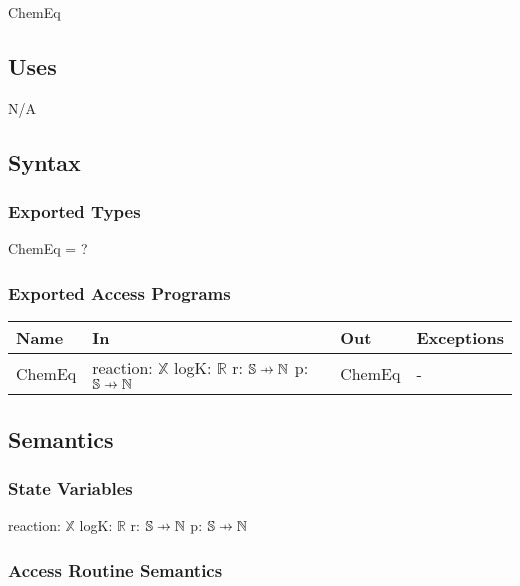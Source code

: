 \documentclass[12pt, titlepage]{article}
\newcommand\pfun{\mathrel{\ooalign{\hfil$\mapstochar\mkern5mu$\hfil\cr$\to$\cr}}}
\begin{document}
ChemEq

\subsection{Uses}

N/A

\subsection{Syntax}

\subsubsection{Exported Types}

ChemEq = ?

\subsubsection{Exported Access Programs}

\begin{center}
\begin{tabular}{p{2cm} p{4cm} p{4cm} p{2cm}}
\hline
\textbf{Name} & \textbf{In} & \textbf{Out} & \textbf{Exceptions} \\
\hline
ChemEq & reaction: $\mathbb{X}$ 
         \newline logK: $\mathbb{R}$
         \newline r: $\mathbb{S} \pfun \mathbb{N}$
         \newline p: $\mathbb{S} \pfun \mathbb{N}$ 
                 & ChemEq & - \\
\hline
\end{tabular}
\end{center}

\subsection{Semantics}

\subsubsection{State Variables}
reaction: $\mathbb{X}$ 
\newline logK: $\mathbb{R}$
\newline r: $\mathbb{S} \pfun \mathbb{N}$
\newline p: $\mathbb{S} \pfun \mathbb{N}$ 


\subsubsection{Access Routine Semantics}
\end{document}
